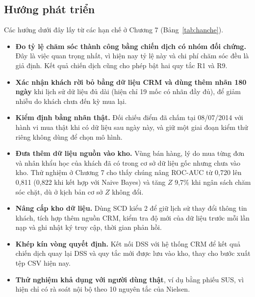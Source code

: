 \subsection{Hướng phát triển}
Các hướng dưới đây lấy từ các hạn chế ở Chương 7 (Bảng~\ref{tab:hanche}).
\begin{itemize}
    \item \textbf{Đo tỷ lệ chăm sóc thành công bằng chiến dịch có nhóm đối chứng.} Đây là việc quan trọng nhất, vì hiện nay tỷ lệ này và chi phí chăm sóc đều là giả định. Kết quả chiến dịch cũng cho phép bật hai quy tắc R1 và R9.
    \item \textbf{Xác nhận khách rời bỏ bằng dữ liệu CRM và dùng thêm nhãn 180 ngày} khi lịch sử dữ liệu đủ dài (hiện chỉ 19 mốc có nhãn đầy đủ), để giảm nhiễu do khách chưa đến kỳ mua lại.
    \item \textbf{Kiểm định bằng nhãn thật.} Đối chiếu điểm đã chấm tại 08/07/2014 với hành vi mua thật khi có dữ liệu sau ngày này, và giữ một giai đoạn kiểm thử riêng không dùng để chọn mô hình.
    \item \textbf{Đưa thêm dữ liệu nguồn vào kho.} Vùng bán hàng, lý do mua từng đơn và nhân khẩu học của khách đã có trong cơ sở dữ liệu gốc nhưng chưa vào kho. Thử nghiệm ở Chương 7 cho thấy chúng nâng ROC-AUC từ 0,720 lên 0,811 (0,822 khi kết hợp với Naive Bayes) và tăng $Z$ 9,7\% khi ngân sách chăm sóc chặt, dù ở kịch bản cơ sở $Z$ không đổi.
    \item \textbf{Nâng cấp kho dữ liệu.} Dùng SCD kiểu 2 để giữ lịch sử thay đổi thông tin khách, tích hợp thêm nguồn CRM, kiểm tra độ mới của dữ liệu trước mỗi lần nạp và ghi nhật ký truy cập, thời gian phản hồi.
    \item \textbf{Khép kín vòng quyết định.} Kết nối DSS với hệ thống CRM để kết quả chiến dịch quay lại DSS và quy tắc mới được lưu vào kho, thay cho bước xuất tệp CSV hiện nay.
    \item \textbf{Thử nghiệm khả dụng với người dùng thật}, ví dụ bằng phiếu SUS, vì hiện chỉ có rà soát nội bộ theo 10 nguyên tắc của Nielsen.
\end{itemize}
